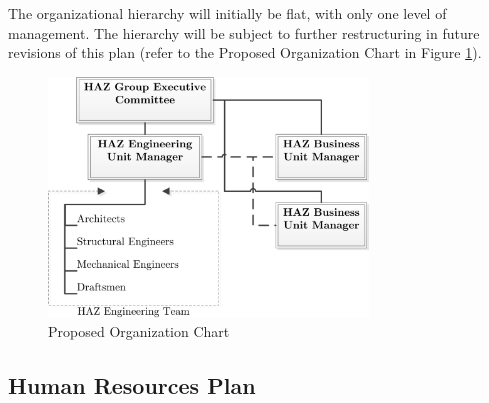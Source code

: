 \documentclass[a4paper,oneside,12pt,final]{article}
\begin{document}
The organizational hierarchy will initially be flat, with only one level of management. The hierarchy will be subject to further restructuring in future revisions of this plan (refer to the Proposed Organization Chart in Figure \ref{fig:organization}).

\begin{figure}[h]
	\centering
	\includegraphics[width=8.5cm]{./organization}
	\caption{Proposed Organization Chart}
	\label{fig:organization}
\end{figure}

\subsection{Human Resources Plan}
\end{document}

